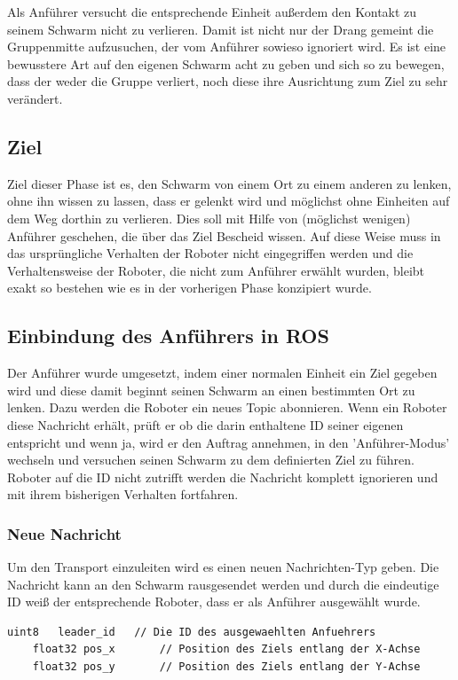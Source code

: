 Als Anführer versucht die entsprechende Einheit außerdem den Kontakt zu seinem Schwarm nicht zu verlieren. Damit ist nicht nur der Drang gemeint die Gruppenmitte aufzusuchen, der vom Anführer sowieso ignoriert wird. Es ist eine bewusstere Art auf den eigenen Schwarm acht zu geben und sich so zu bewegen, dass der weder die Gruppe verliert, noch diese ihre Ausrichtung zum Ziel zu sehr verändert.

\subsection*{Ziel}

Ziel dieser Phase ist es, den Schwarm von einem Ort zu einem anderen zu lenken, ohne ihn wissen zu lassen, dass er gelenkt wird und möglichst ohne Einheiten auf dem Weg dorthin zu verlieren. Dies soll mit Hilfe von (möglichst wenigen) Anführer geschehen, die über das Ziel Bescheid wissen. Auf diese Weise muss in das ursprüngliche Verhalten der Roboter nicht eingegriffen werden und die Verhaltensweise der Roboter, die nicht zum Anführer erwählt wurden, bleibt exakt so bestehen wie es in der vorherigen Phase konzipiert wurde.

\subsection*{Einbindung des Anführers in ROS}

Der Anführer wurde umgesetzt, indem einer normalen Einheit ein Ziel gegeben wird und diese damit beginnt seinen Schwarm an einen bestimmten Ort zu lenken. Dazu werden die Roboter ein neues Topic abonnieren. Wenn ein Roboter diese Nachricht erhält, prüft er ob die darin enthaltene ID seiner eigenen entspricht und wenn ja, wird er den Auftrag annehmen, in den 'Anführer-Modus' wechseln und versuchen seinen Schwarm zu dem definierten Ziel zu führen. Roboter auf die ID nicht zutrifft werden die Nachricht komplett ignorieren und mit ihrem bisherigen Verhalten fortfahren.

\subsubsection*{Neue Nachricht}

Um den Transport einzuleiten wird es einen neuen Nachrichten-Typ geben. Die Nachricht kann an den Schwarm rausgesendet werden und durch die eindeutige ID weiß der entsprechende Roboter, dass er als Anführer ausgewählt wurde.

\begin{lstlisting}[style=ros, title=Nachrichten-Typ: New\_Mission]
	uint8	leader_id	// Die ID des ausgewaehlten Anfuehrers
	float32 pos_x		// Position des Ziels entlang der X-Achse
	float32 pos_y		// Position des Ziels entlang der Y-Achse
\end{lstlisting}

